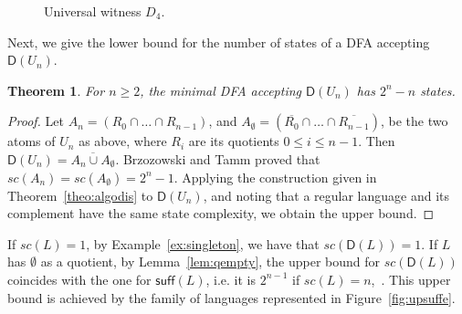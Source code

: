 \documentclass{article}
\newtheorem{theorem}{Theorem}
\newcommand{\dfa}{DFA\xspace}
\newcommand{\comp}[1]{\overline{#1}}
\newcommand{\suff}[1]{\mathsf{suff}(#1)}
\newcommand{\dis}[1]{\mathsf{D}(#1)}
\begin{document}
\begin{figure}[h!]
\begin{center}
 \end{center}
\caption{Universal witness $D_4$.} 
\label{fig:univ} 
\end{figure}
Next, we give the lower bound for the number of states of a 
\dfa accepting $\dis{U_n}$.
\begin{theorem}
    \label{theo:scdisttight}
For $n\geq 2$, the minimal \dfa accepting $\dis{U_n}$ has $2^n-n$ states.
\end{theorem}
\begin{proof}
  Let $A_n=(R_0\cap \ldots \cap R_{n-1})$, and 
$A_\emptyset=(\comp{R_0}\cap \ldots \cap \comp{R_{n-1}})$, 
be the two atoms of $U_n$ as above, where $R_i$ are its quotients $0\leq i\leq n-1$. 
Then $\dis{U_n}=\comp{A_n\cup A_\emptyset}$.  
Brzozowski and Tamm proved that
  $sc(A_n)=sc(A_\emptyset)=2^n-1$. 
Applying the construction given
  in Theorem~\ref{theo:algodis} to $\dis{U_n}$, and noting that a regular language
  and its complement have the same state complexity, we obtain the upper
  bound.
\end{proof}

If $sc(L)=1$, by Example~\ref{ex:singleton}, we have that $sc(\dis{L})=1$. If $L$ has $\emptyset$ as a quotient, by Lemma~\ref{lem:qempty},  the upper bound for $sc(\dis{L})$ coincides with the one for $\suff{L}$, i.e. it is $2^{n-1}$ if $sc(L)=n$,~\cite{brzozowski14:_quotien_compl_of_closed_languag}. This upper bound is achieved by the family of languages represented in Figure~\ref{fig:upsuffe}.
\end{document}
